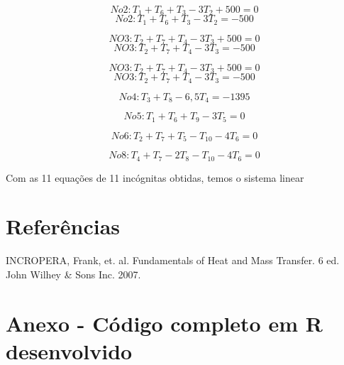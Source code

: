 \documentclass[12pt]{scrartcl}
\begin{document}
\[  No 2: T_1 + T_6 + T_3 - 3T_2 + 500 = 0 \]
\[  No 2: T_1 + T_6 + T_3 - 3T_2 = - 500 \]

\[  NO 3: T_2 + T_7 + T_4 - 3T_3 + 500 = 0 \]
\[  NO 3: T_2 + T_7 + T_4 - 3T_3 = - 500 \]

\[  NO 3: T_2 + T_7 + T_4 - 3T_3 + 500 = 0 \]
\[  NO 3: T_2 + T_7 + T_4 - 3T_3 = - 500 \]

\[  No 4: T_3 + T_8 - 6,5 T_4 = -1395 \]

\[  No 5: T_1 + T_6 + T_9 - 3T_5 = 0 \]

\[  No 6: T_2 + T_7 + T_5 - T_{10} - 4T_6 = 0 \]


\[  No 8: T_4 + T_7 - 2T_8 - T_{10} - 4T_6 = 0 \]






Com as 11 equações de 11 incógnitas obtidas, temos o sistema linear

\section{Referências}

INCROPERA, Frank, et. al. Fundamentals of Heat and Mass Transfer. 6 ed. John Wilhey \& Sons Inc. 2007. \\

\section{Anexo - Código completo em R desenvolvido}
\end{document}

